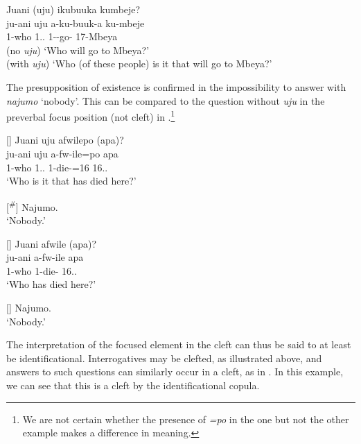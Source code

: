 \documentclass[output=paper]{langscibook}
\begin{document}
\ea
\label{bkm:Ref98082217}
Juani (uju) ikubuuka kumbeje?\\
\gll
ju-ani  uju  a-ku-buuk-a  ku-mbeje\\
1-who  1.\DEM.\PROX{}  1\SM-\PRS{}-go-\FV{}  17-Mbeya\\
\glt
(no \textit{uju}) ‘Who will go to Mbeya?’\\
(with \textit{uju}) ‘Who (of these people) is it that will go to Mbeya?’


\z


The presupposition of existence is confirmed in the impossibility to answer  with \textit{najumo} ‘nobody’. This can be compared to the question without \textit{uju} in the preverbal focus position (not cleft) in .\footnote{We are not certain whether the presence of \textit{=po} in the one but not the other example makes a difference in meaning.}

\ea
\begin{xlist}
[]{
\label{bkm:Ref98083788}
Juani uju afwilepo (apa)?\\
\gll
ju-ani  uju  a-fw-ile=po  apa\\
1-who  1.\DEM{}.\PROX{}  1\SM{}-die-\PFV{}=16  16.\DEM{}.\PROX{}\\
\glt
‘Who is it that has died here?’\\
}

[\textsuperscript{\#}]{
Najumo.\\
\glt ‘Nobody.’
}
\end{xlist}
\z

\ea
\begin{xlist}
[]{
\label{bkm:Ref114653070}
Juani afwile (apa)?\\
\gll
ju-ani  a-fw-ile  apa\\
1-who  1\SM{}-die-\PFV{}  16.\DEM.\PROX{}\\
\glt
‘Who has died here?’\\
}

[]{
Najumo.\\
\glt ‘Nobody.’
}

\end{xlist}
\z

The interpretation of the focused element in the cleft can thus be said to at least be identificational. Interrogatives may be clefted, as illustrated above, and answers to such questions can similarly occur in a cleft, as in . In this example, we can see that this is a cleft by the identificational copula.\largerpage[-1]\pagebreak
\end{document}
